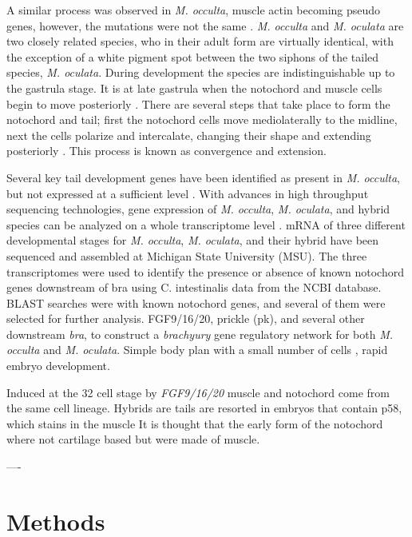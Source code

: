 A similar process was observed in \textit{M. occulta}, muscle actin becoming pseudo genes, however, the mutations were not the same \cite{}. \textit{M. occulta} and \textit{M. oculata} are two closely related species, who in their adult form are virtually identical, with the exception of a white pigment spot between the two siphons of the tailed species, \textit{M. oculata}. During development the species are indistinguishable up to the gastrula stage. It is at late gastrula when the notochord and muscle cells begin to move posteriorly \cite{swalla_novel_1993}. There are several steps that take place to form the notochord and tail; first the notochord cells move mediolaterally to the midline, next the cells polarize and intercalate, changing their shape and extending posteriorly \cite{keller_mechanisms_2000, jiang_ascidian_2005,stemple_structure_2005}. This process is known as convergence and extension. 

Several key tail development genes have been identified as present in \textit{M. occulta}, but not expressed at a sufficient level \cite{swalla_interspecific_1990,jeffery_factors_1992,swalla_novel_1993}. With advances in high throughput sequencing technologies, gene expression of \textit{M. occulta}, \textit{M. oculata}, and hybrid species can be analyzed on a whole transcriptome level \cite{gyoja_analysis_2007,pickrell_variation_2010}. mRNA of three different developmental stages for \textit{M. occulta}, \textit{M. oculata}, and their hybrid have been sequenced and assembled at Michigan State University (MSU). The three transcriptomes were used to identify the presence or absence of known notochord genes downstream of bra using C. intestinalis data from the NCBI database. BLAST searches were with known notochord genes, and several of them were selected for further analysis. FGF9/16/20, prickle (pk), and several other downstream \textit{bra}, to construct a \textit{brachyury} gene regulatory network for both \textit{M. occulta} and \textit{M. oculata}. 
Simple body plan with a small number of cells \cite{satoh_ascidian_2001,satoh_genome_2002}, rapid embryo development.

Induced at the 32 cell stage by \textit{FGF9/16/20}
muscle and notochord come from the same cell lineage.
Hybrids are tails are resorted in embryos that contain p58, which stains in the muscle 
It is thought that the early form of the notochord where not cartilage based but were made of muscle.   

----

\section{Methods}
